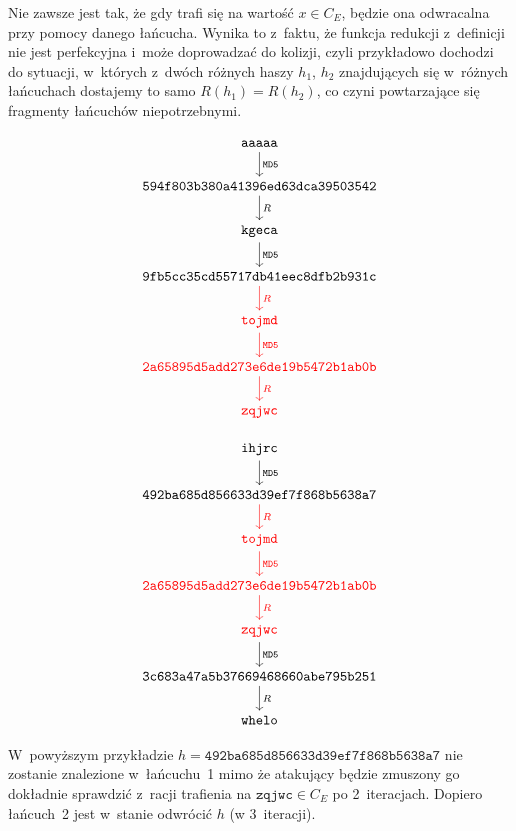 Nie zawsze jest tak, że gdy trafi się na wartość $x \in C_E$, będzie ona
odwracalna przy pomocy danego łańcucha. Wynika to z~faktu, że funkcja redukcji
z~definicji nie jest perfekcyjna i~może doprowadzać do kolizji, czyli
przykładowo dochodzi do sytuacji, w~których z~dwóch różnych haszy $h_1$, $h_2$
znajdujących się w~różnych łańcuchach dostajemy to samo $R(h_1) = R(h_2)$, co
czyni powtarzające się fragmenty łańcuchów niepotrzebnymi.

\begin{multicols}{2}
    \[
    \begin{tikzcd}
        \mathtt{aaaaa} \arrow{d}{\mathtt{MD5}} \\
        \mathtt{594f803b380a41396ed63dca39503542} \arrow{d}{R} \\
        \mathtt{kgeca} \arrow{d}{\mathtt{MD5}} \\
        \mathtt{9fb5cc35cd55717db41eec8dfb2b931c} \arrow[color=red]{d}{R} \\
        \mathtt{\textcolor{red}{tojmd}} \arrow[color=red]{d}{\mathtt{MD5}} \\
        \mathtt{\textcolor{red}{2a65895d5add273e6de19b5472b1ab0b}} \arrow[color=red]{d}{R} \\
        \mathtt{\textcolor{red}{zqjwc}}
    \end{tikzcd}
    \]

\columnbreak

    \[
    \begin{tikzcd}
        \mathtt{ihjrc} \arrow{d}{\mathtt{MD5}} \\
        \mathtt{492ba685d856633d39ef7f868b5638a7} \arrow[color=red]{d}{R} \\
        \mathtt{\textcolor{red}{tojmd}} \arrow[color=red]{d}{\mathtt{MD5}} \\
        \mathtt{\textcolor{red}{2a65895d5add273e6de19b5472b1ab0b}} \arrow[color=red]{d}{R} \\
        \mathtt{\textcolor{red}{zqjwc}} \arrow{d}{\mathtt{MD5}} \\
        \mathtt{3c683a47a5b37669468660abe795b251} \arrow{d}{R} \\
        \mathtt{whelo}
    \end{tikzcd}
    \]
\end{multicols}

W~powyższym przykładzie $h = \mathtt{492ba685d856633d39ef7f868b5638a7}$ nie
zostanie znalezione w~łańcuchu~1 mimo że atakujący będzie zmuszony go dokładnie
sprawdzić z~racji trafienia na $\mathtt{zqjwc} \in C_E$ po 2~iteracjach.
Dopiero łańcuch~2 jest w~stanie odwrócić $h$ (w 3~iteracji).



